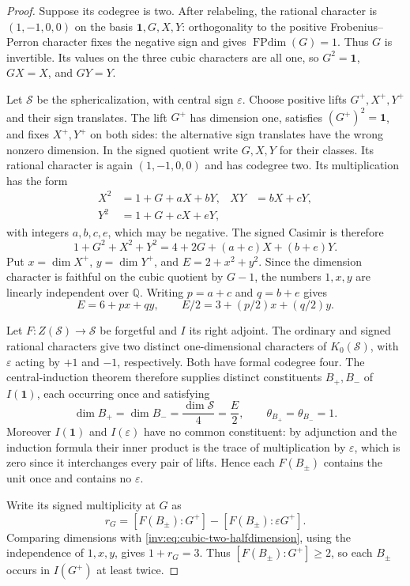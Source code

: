 \documentclass[11pt,a4paper]{article}
\theoremstyle{definition}\newtheorem{definition}[theorem]{Definition}
\theoremstyle{remark}\newtheorem{remark}[theorem]{Remark}
\newcommand{\Q}{\mathbb Q}
\numberwithin{equation}{section}
\begin{document}
\begin{proof}
Suppose its codegree is two. After relabeling, the rational character is
$(1,-1,0,0)$ on the basis $\mathbf1,G,X,Y$: orthogonality to the positive
Frobenius--Perron character fixes the negative sign and gives
$\operatorname{FPdim}(G)=1$. Thus $G$ is invertible. Its values on the
three cubic characters are all one, so $G^2=\mathbf1$, $GX=X$, and $GY=Y$.

Let $\mathcal S$ be the sphericalization, with central sign $\varepsilon$.
Choose positive lifts $G^+,X^+,Y^+$ and their sign translates.
The lift $G^+$ has dimension one, satisfies $(G^+)^2=\mathbf1$, and fixes
$X^+,Y^+$ on both sides: the alternative sign translates have the wrong
nonzero dimension. In the signed quotient write $G,X,Y$ for their
classes. Its rational character is again $(1,-1,0,0)$ and has codegree
two. Its multiplication has the form
\[
 \begin{aligned}
 X^2&=1+G+aX+bY,& XY&=bX+cY,\\
 Y^2&=1+G+cX+eY,
 \end{aligned}
\]
with integers $a,b,c,e$, which may be negative. The signed Casimir is
therefore
\[
 1+G^2+X^2+Y^2=4+2G+(a+c)X+(b+e)Y.
\]
Put $x=\dim X^+$, $y=\dim Y^+$, and $E=2+x^2+y^2$.
Since the dimension character is faithful on the cubic quotient by
$G-1$, the numbers $1,x,y$ are linearly independent over $\Q$.
Writing $p=a+c$ and $q=b+e$ gives
\begin{equation}\label{inv:eq:cubic-two-halfdimension}
 E=6+px+qy,\qquad E/2=3+(p/2)x+(q/2)y.
\end{equation}

Let $F:Z(\mathcal S)\to\mathcal S$ be forgetful and $I$ its right
adjoint. The ordinary and signed rational characters give two distinct
one-dimensional characters of $K_0(\mathcal S)$, with $\varepsilon$
acting by $+1$ and $-1$, respectively. Both have formal codegree four.
The central-induction theorem therefore supplies distinct constituents
$B_+,B_-$ of $I(\mathbf1)$, each occurring once and satisfying
\[
 \dim B_+=\dim B_-=\frac{\dim\mathcal S}{4}=\frac E2,
 \qquad \theta_{B_+}=\theta_{B_-}=1.
\]
Moreover $I(\mathbf1)$ and $I(\varepsilon)$ have no common constituent:
by adjunction and the induction formula their inner product is the
trace of multiplication by $\varepsilon$, which is zero since it
interchanges every pair of lifts. Hence each $F(B_\pm)$ contains the
unit once and contains no $\varepsilon$.

Write its signed multiplicity at $G$ as
\[
 r_G=[F(B_\pm):G^+]-[F(B_\pm):\varepsilon G^+].
\]
Comparing dimensions with \eqref{inv:eq:cubic-two-halfdimension}, using
the independence of $1,x,y$, gives $1+r_G=3$. Thus
$[F(B_\pm):G^+]\ge2$, so each $B_\pm$ occurs in $I(G^+)$ at least twice.


\end{proof}
\end{document}
